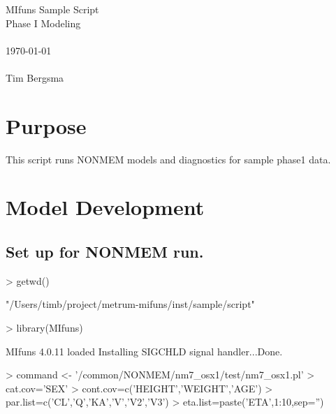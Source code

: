 
\usepackage{Sweave}

 

\vspace*{2cm}
\begin{center}
{\Large MIfuns Sample Script}\\
\vspace{1.5cm}
{\Large Phase I Modeling}\\
~\\
\today\\
~\\
Tim Bergsma\\
\end{center}
\newpage

\section{Purpose}
This script runs NONMEM models and diagnostics for sample phase1 data.
\section{Model Development}
\subsection{Set up for NONMEM run.}
\begin{Schunk}
\begin{Sinput}
> getwd()
\end{Sinput}
\begin{Soutput}
[1] "/Users/timb/project/metrum-mifuns/inst/sample/script"
\end{Soutput}
\begin{Sinput}
> library(MIfuns)
\end{Sinput}
\begin{Soutput}
MIfuns 4.0.11 loaded
Installing SIGCHLD signal handler...Done.
\end{Soutput}
\begin{Sinput}
> command <- '/common/NONMEM/nm7_osx1/test/nm7_osx1.pl'
> cat.cov='SEX'
> cont.cov=c('HEIGHT','WEIGHT','AGE')
> par.list=c('CL','Q','KA','V','V2','V3')
> eta.list=paste('ETA',1:10,sep='')
\end{Sinput}
\end{Schunk}
